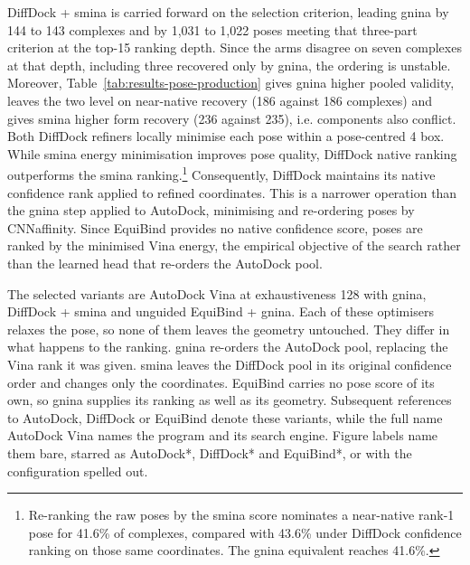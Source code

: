DiffDock + smina is carried forward on the selection criterion, leading gnina by 144 to 143 complexes and by 1,031 to 1,022 poses meeting that three-part criterion at the top-15 ranking depth. Since the arms disagree on seven complexes at that depth, including three recovered only by gnina, the ordering is unstable. Moreover, Table~\ref{tab:results-pose-production} gives gnina higher pooled validity, leaves the two level on near-native recovery (186 against 186 complexes) and gives smina higher form recovery (236 against 235), i.e. components also conflict.  Both DiffDock refiners locally minimise each pose within a pose-centred 4\angstrom{} box. While smina energy minimisation improves pose quality, DiffDock native ranking outperforms the smina ranking.\footnote{Re-ranking the raw poses by the smina score nominates a near-native rank-1 pose for 41.6\% of complexes, compared with 43.6\% under DiffDock confidence ranking on those same coordinates. The gnina equivalent reaches 41.6\%.} Consequently, DiffDock maintains its native confidence rank applied to refined coordinates. This is a narrower operation than the gnina step applied to AutoDock, minimising and re-ordering poses by CNNaffinity. Since EquiBind provides no native confidence score, poses are ranked by the minimised Vina energy, the empirical objective of the search rather than the learned head that re-orders the AutoDock pool.

The selected variants are AutoDock Vina at exhaustiveness 128 with gnina, DiffDock + smina and unguided EquiBind + gnina. Each of these optimisers relaxes the pose, so none of them leaves the geometry untouched. They differ in what happens to the ranking. gnina re-orders the AutoDock pool, replacing the Vina rank it was given. smina leaves the DiffDock pool in its original confidence order and changes only the coordinates. EquiBind carries no pose score of its own, so gnina supplies its ranking as well as its geometry. Subsequent references to AutoDock, DiffDock or EquiBind denote these variants, while the full name AutoDock Vina names the program and its search engine. Figure labels name them bare, starred as AutoDock*, DiffDock* and EquiBind*, or with the configuration spelled out.

